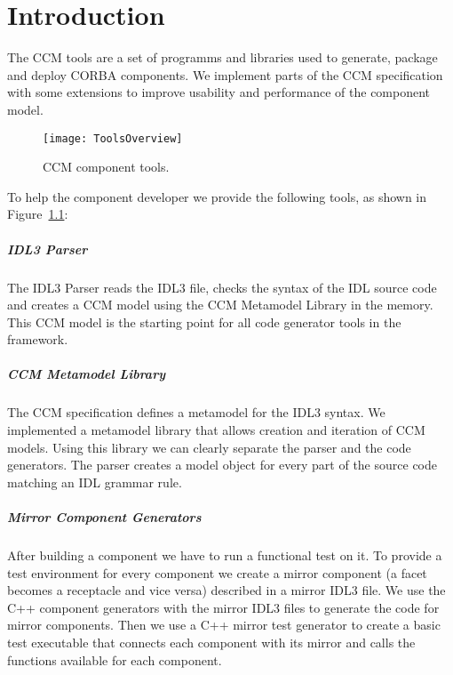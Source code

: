 \chapter{Introduction}

The CCM tools are a set of programms and libraries used to generate, package and
deploy CORBA components. We implement parts of the CCM specification
\cite{CCMSpecification} with some extensions to improve usability and
performance of the component model.

\begin{figure}
\centering
\texttt{[image: ToolsOverview]}
\caption{CCM component tools.}
\label{fig:intro-ToolsOverview}
\end{figure}

To help the component developer we provide the following tools, as shown in
Figure~\ref{fig:intro-ToolsOverview}:

\paragraph{IDL3 Parser}

The IDL3 Parser reads the IDL3 file, checks the syntax of the IDL source code
and creates a CCM model using the CCM Metamodel Library in the memory. This CCM
model is the starting point for all code generator tools in the framework.

\paragraph{CCM Metamodel Library}

The CCM specification defines a metamodel for the IDL3 syntax. We implemented a
metamodel library that allows creation and iteration of CCM models. Using this
library we can clearly separate the parser and the code generators. The parser
creates a model object for every part of the source code matching an IDL grammar
rule.

\paragraph{Mirror Component Generators}

After building a component we have to run a functional test on it. To provide a
test environment for every component we create a mirror component (a facet
becomes a receptacle and vice versa) described in a mirror IDL3 file. We use the
C++ component generators with the mirror IDL3 files to generate the code for
mirror components. Then we use a C++ mirror test generator to create a basic
test executable that connects each component with its mirror and calls the
functions available for each component.


